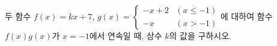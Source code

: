 두 함수 $f(x)=kx+7$, $g(x)=\begin{cases} -x+2 & (x\le -1) \\ -x & (x>-1) \end{cases}$에 대하여 함수 $f(x)g(x)$가 $x=-1$에서 연속일 때, 상수 $k$의 값을 구하시오.
